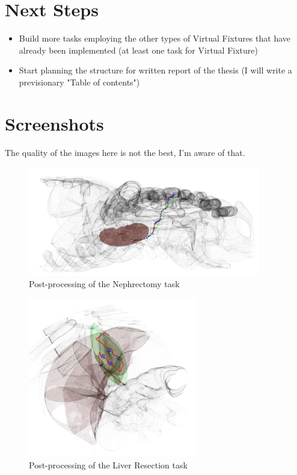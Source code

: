 \documentclass{article}
\begin{document}
\section*{Next Steps}
\begin{itemize}
    \item Build more tasks employing the other types of Virtual Fixtures that have already been implemented (at least one task for Virtual Fixture)
    \item Start planning the structure for written report of the thesis (I will write a previsionary "Table of contents")
\end{itemize}

\newpage
\section*{Screenshots}
The quality of the images here is not the best, I'm aware of that.
    \begin{figure}[h!]
        \begin{small}
            \begin{center}
                \includegraphics[width=0.9\textwidth]{trajectory.png}
            \end{center}
            \caption{Post-processing of the Nephrectomy task}
        \end{small}
    \end{figure}
    \begin{figure}[h!]
        \begin{small}
            \begin{center}
                \includegraphics[width=0.65\textwidth]{surface.png}
            \end{center}
            \caption{Post-processing of the Liver Resection task}
        \end{small}
    \end{figure}

    
\end{document}
